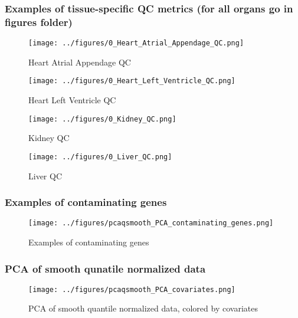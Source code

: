\documentclass{article}
\begin{document}
\FloatBarrier
\subsubsection{Examples of tissue-specific QC metrics (for all organs go in figures folder)}

\begin{figure}[htbp]
  \centering
  \texttt{[image: ../figures/0\_Heart\_Atrial\_Appendage\_QC.png]}
  \caption{Heart Atrial Appendage QC}
  \label{fig:0_Heart_Atrial_Appendage_QC}
\end{figure}

\begin{figure}[htbp]
  \centering
  \texttt{[image: ../figures/0\_Heart\_Left\_Ventricle\_QC.png]}
  \caption{Heart Left Ventricle QC}
  \label{fig:0_Heart_Left_Ventricle_QC}
\end{figure}

\begin{figure}[htbp]
  \centering
  \texttt{[image: ../figures/0\_Kidney\_QC.png]}
  \caption{Kidney QC}
  \label{fig:0_Kidney_QC}
\end{figure}

\begin{figure}[htbp]
  \centering
  \texttt{[image: ../figures/0\_Liver\_QC.png]}
  \caption{Liver QC}
  \label{fig:0_Liver_QC}
\end{figure}

\FloatBarrier
\subsubsection{Examples of contaminating genes}
\begin{figure}[htbp]
  \centering
  \texttt{[image: ../figures/pcaqsmooth\_PCA\_contaminating\_genes.png]}
  \caption{Examples of contaminating genes}
  \label{fig:contaminating_genes}
\end{figure}

\subsubsection{PCA of smooth qunatile normalized data}
\begin{figure}[htbp]
  \centering
  \texttt{[image: ../figures/pcaqsmooth\_PCA\_covariates.png]}
  \caption{PCA of smooth quantile normalized data, colored by covariates}
  \label{fig:pca_covariates}
\end{figure}





\end{document}

